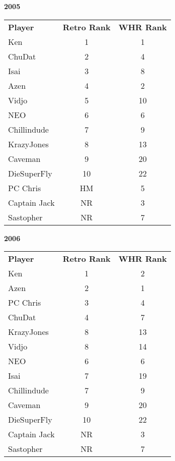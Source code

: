 \documentclass[10pt]{article}
\theoremstyle{definition}
\theoremstyle{remark}
\begin{document}
\textbf{2005}
\begin{tabular}{lcc}
    \textbf{Player} & \textbf{Retro Rank} & \textbf{WHR Rank} \\
    Ken             & 1                      & 1        \\
    ChuDat          & 2                      & 4        \\
    Isai            & 3                      & 8        \\
    Azen            & 4                      & 2        \\
    Vidjo           & 5                      & 10       \\
    NEO             & 6                      & 6        \\
    Chillindude     & 7                      & 9        \\
    KrazyJones      & 8                      & 13       \\
    Caveman         & 9                      & 20       \\
    DieSuperFly     & 10                     & 22       \\
    PC Chris        & HM                     & 5        \\
    Captain Jack    & NR                     & 3        \\
    Sastopher       & NR                     & 7        \\
\end{tabular}

\textbf{2006}
\begin{tabular}{lcc}
    \textbf{Player} & \textbf{Retro Rank} & \textbf{WHR Rank} \\
    Ken             & 1                      & 2        \\
    Azen            & 2                      & 1        \\
    PC Chris        & 3                      & 4        \\
    ChuDat          & 4                      & 7        \\
    KrazyJones      & 8                      & 13       \\
    Vidjo           & 8                      & 14       \\
    NEO             & 6                      & 6        \\
    Isai            & 7                      & 19       \\
    Chillindude     & 7                      & 9        \\
    Caveman         & 9                      & 20       \\
    DieSuperFly     & 10                     & 22       \\
    Captain Jack    & NR                     & 3        \\
    Sastopher       & NR                     & 7        \\
\end{tabular}
\end{document}
